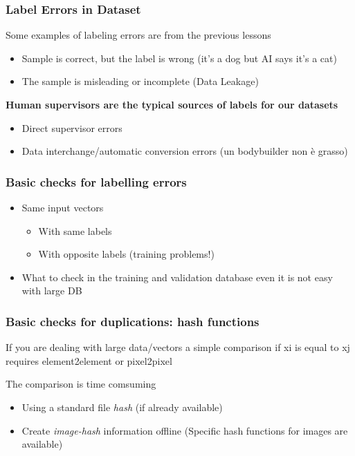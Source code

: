 \subsubsection{Label Errors in Dataset}
\noindent Some examples of labeling errors are from the previous lessons
\begin{itemize}
    \item Sample is correct, but the label is wrong (it's a dog but AI says it's a cat)
    \item The sample is misleading or incomplete (Data Leakage)
\end{itemize}

\noindent \textbf{Human supervisors are the typical sources of labels for our datasets}
\begin{itemize}
    \item Direct supervisor errors
    \item Data interchange/automatic conversion errors (un bodybuilder non è grasso)
\end{itemize}

\subsubsection{Basic checks for labelling errors}
\begin{itemize}
    \item Same input vectors 
    \begin{itemize}
        \item With same labels 
        \item With opposite labels (training problems!)
    \end{itemize}
    \item What to check in the training and validation database even it is not easy with large DB 
\end{itemize}

\subsubsection{Basic checks for duplications: hash functions}
\noindent If you are dealing with large data/vectors a simple comparison if xi is equal to xj requires element2element or pixel2pixel 

\noindent The comparison is time comsuming
\begin{itemize}
    \item Using a standard file \textit{hash} (if already available)
    \item Create \textit{image-hash} information offline (Specific hash functions for images are available)
\end{itemize}

